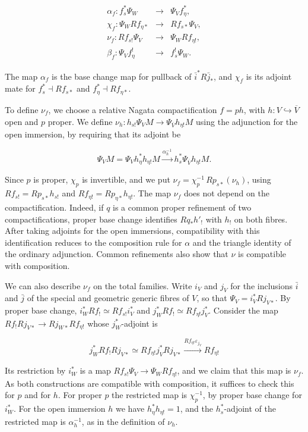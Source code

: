 \documentclass[11pt]{article}
\begin{document}
\[
\begin{array}{rcl}
\alpha_f:f_s^*\Psi_W&\longrightarrow&\Psi_Vf_\eta^*,\\
\chi_f:\Psi_WRf_{\eta*}&\longrightarrow&Rf_{s*}\Psi_V,\\
\nu_f:Rf_{s!}\Psi_V&\longrightarrow&\Psi_WRf_{\eta!},\\
\beta_f:\Psi_Vf_\eta^!&\longrightarrow&f_s^!\Psi_W.
\end{array}
\]

The map \(\alpha_f\) is the base change map for pullback of \(\bar i^*R\bar j_*\), and \(\chi_f\) is its adjoint mate for \(f_s^*\dashv Rf_{s*}\) and \(f_\eta^*\dashv Rf_{\eta*}\).

To define \(\nu_f\), we choose a relative Nagata compactification \(f=ph\), with \(h:V\hookrightarrow\overline V\) open and \(p\) proper. We define \(\nu_h:h_{s!}\Psi_VM\to \Psi_{\overline V}h_{\eta!}M\) using the adjunction for the open immersion, by requiring that its adjoint be

\[
\Psi_VM=\Psi_Vh_\eta^*h_{\eta!}M
\xrightarrow{\alpha_h^{-1}}h_s^*\Psi_{\overline V}h_{\eta!}M.
\]

Since \(p\) is proper, \(\chi_p\) is invertible, and we put \(\nu_f=\chi_p^{-1}\,Rp_{s*}(\nu_h)\), using \(Rf_{s!}=Rp_{s*}h_{s!}\) and \(Rf_{\eta!}=Rp_{\eta*}h_{\eta!}\). The map \(\nu_f\) does not depend on the compactification. Indeed, if \(q\) is a common proper refinement of two compactifications, proper base change identifies \(Rq_*h'_!\) with \(h_!\) on both fibres. After taking adjoints for the open immersions, compatibility with this identification reduces to the composition rule for \(\alpha\) and the triangle identity of the ordinary adjunction. Common refinements also show that \(\nu\) is compatible with composition.

We can also describe \(\nu_f\) on the total families. Write \(i_V\) and \(j_V\) for the inclusions \(\bar i\) and \(\bar j\) of the special and geometric generic fibres of \(V\), so that \(\Psi_V=i_V^*Rj_{V*}\). By proper base change, \(i_W^*Rf_!\simeq Rf_{s!}i_V^*\) and \(j_W^*Rf_!\simeq Rf_{\eta!}j_V^*\). Consider the map \(Rf_!Rj_{V*}\to Rj_{W*}Rf_{\eta!}\) whose \(j_W^*\)-adjoint is

\[
j_W^*Rf_!Rj_{V*}\simeq Rf_{\eta!}j_V^*Rj_{V*}
\xrightarrow{Rf_{\eta!}\varepsilon_{j_V}}Rf_{\eta!}
\]

Its restriction by \(i_W^*\) is a map \(Rf_{s!}\Psi_V\to \Psi_WRf_{\eta!}\), and we claim that this map is \(\nu_f\). As both constructions are compatible with composition, it suffices to check this for \(p\) and for \(h\). For proper \(p\) the restricted map is \(\chi_p^{-1}\), by proper base change for \(i_W^*\). For the open immersion \(h\) we have \(h_\eta^*h_{\eta!}=1\), and the \(h_s^*\)-adjoint of the restricted map is \(\alpha_h^{-1}\), as in the definition of \(\nu_h\).
\end{document}
